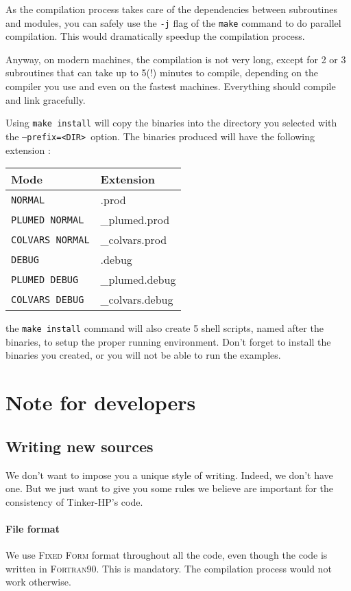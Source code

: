\documentclass[peerreview]{IEEEtran}
\def\prefix{\texttt{--prefix=<DIR>}}
\begin{document}
As the compilation process takes care of the dependencies between subroutines and modules, you can safely use the \texttt{-j} flag of the \texttt{make} command to do parallel compilation. This would dramatically speedup the compilation process. 

Anyway, on modern machines, the compilation is not very long, except for 2 or 3 subroutines that can take up to 5(!) minutes to compile, depending on the compiler you use and even on the fastest machines. Everything should compile and link gracefully.

Using \texttt{make install} will copy the binaries into the directory you selected with the \prefix\ option. The binaries produced will have the following extension :

\begin{center}
\begin{tabular}{|l|l|}
\hline
Mode & Extension \\
\hline
\hline
\texttt{NORMAL} & .prod \\
\texttt{PLUMED NORMAL} & \_plumed.prod \\
\texttt{COLVARS NORMAL} & \_colvars.prod \\
\texttt{DEBUG}  & .debug \\
\texttt{PLUMED DEBUG} & \_plumed.debug \\
\texttt{COLVARS DEBUG} & \_colvars.debug \\
\hline
\end{tabular}
\end{center}

the \texttt{make install} command will also create 5 shell scripts, named after the binaries, to setup the proper running environment.  Don't forget to install the binaries you created, or you will not be able to run the examples.

\section{Note for developers}
\subsection{Writing new sources}
We don't want to impose you a unique style of writing. Indeed, we don't have one. But we just want to give you some rules we believe are important for the consistency of Tinker-HP's code.

\paragraph{File format}
We use \textsc{Fixed Form} format throughout all the code, even though the code is written in \textsc{Fortran90}. This is mandatory. The compilation process would not work otherwise.
\end{document}

